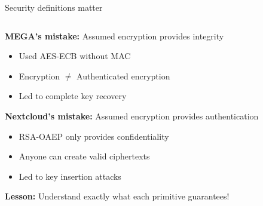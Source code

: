 \documentclass[aspectratio=169, lualatex, handout]{beamer}
\begin{document}
\begin{frame}{Security definitions matter}
	\begin{columns}[c]
		\begin{column}{1\textwidth}
			\textbf{MEGA's mistake:} Assumed encryption provides integrity
			\begin{itemize}
				\item Used AES-ECB without MAC
				\item Encryption $\neq$ Authenticated encryption
				\item Led to complete key recovery
			\end{itemize}
			\textbf{Nextcloud's mistake:} Assumed encryption provides authentication
			\begin{itemize}
				\item RSA-OAEP only provides confidentiality
				\item Anyone can create valid ciphertexts
				\item Led to key insertion attacks
			\end{itemize}
			\textbf{Lesson:} Understand exactly what each primitive guarantees!
		\end{column}
	\end{columns}
\end{frame}
\end{document}
